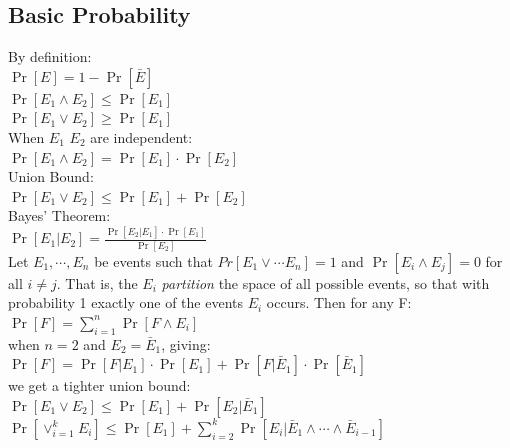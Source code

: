 \subsection*{Basic Probability}

By definition:\\
$\Pr[E] = 1 - \Pr[\bar{E}]$\\
$\Pr[E_1\wedge E_2]\le \Pr[E_1]$\\
$\Pr[E_1 \vee E_2]\ge\Pr[E_1]$\\
When $E_1$ $E_2$ are independent:\\
$\Pr[E_1\wedge E_2]=\Pr[E_1] \cdot \Pr[E_2]$\\
Union Bound:\\
$\Pr[E_1\vee E_2]\le\Pr[E_1]+\Pr[E_2]$\\
Bayes' Theorem:\\
$\Pr[E_1|E_2] = \frac{\Pr[E_2|E_1]\cdot\Pr[E_1]}{\Pr[E_2]}$\\
Let $E_1,\cdots ,E_n$ be events such that $Pr[E_1\vee\cdots E_n]=1$ and 
$\Pr[E_i\wedge E_j]=0$ for all $i\neq j$. That is, the ${E_i}$ \emph{partition} 
the space of all possible events, so that with probability 1 exactly one of the
events $E_i$ occurs. Then for any F:\\
$\Pr[F]=\sum_{i=1}^{n}\Pr[F\wedge E_i]$\\
when $n=2$ and $E_2=\bar{E}_1$, giving:\\
$\Pr[F]=\Pr[F|E_1]\cdot\Pr[E_1]+\Pr[F|\bar{E}_1]\cdot\Pr[\bar{E}_1]$\\
we get a tighter union bound:\\
$\Pr[E_1\vee E_2]\le\Pr[E_1]+\Pr[E_2|\bar{E}_1]$\\
$\Pr[\vee^{k}_{i=1}E_{i}]
\le\Pr[E_1]+\sum^{k}_{i=2}\Pr[E_i|\bar{E}_1\wedge\cdots\wedge\bar{E}_{i-1}]$\\
